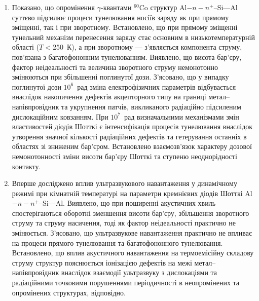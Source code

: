\begin{enumerate}[leftmargin=0cm,itemindent=3em]
\item
     Показано, що опромінення $\gamma$-квантами $^{60}$Co структур Al$-n-n^+$--Si---Al суттєво підсилює процеси тунелювання носіїв заряду як при прямому зміщенні, так і при зворотному.
     Встановлено, що при прямому зміщенні тунельний механізм перенесення заряду стає основним в низькотемпературній області ($T<250$~К),
а при зворотному --- з'являється компонента струму, пов'язана з багатофононним тунелюванням.
 Виявлено, що висота бар'єру, фактор неідеальності та величина зворотного струму немонотонно змінюються при збільшенні поглинутої дози.
З'ясовано, що у випадку поглинутої дози $10^6$~рад зміна
електрофізичних
параметрів відбувається внаслідок накопичення дефектів акцепторного типу на границі метал--напівпровідник та укрупнення патчів, викликаного радіаційно підсиленим дислокаційним ковзанням.
При $10^7$~рад
визначальними механізмами змін властивостей діодів Шотткі є інтенсифікація процесів тунелювання внаслідок утворення значної кількості радіаційних дефектів та гетерування останніх в областях зі зниженим бар'єром.
Встановлено взаємозв'язок характеру дозової немонотонності зміни висоти бар'єру Шотткі та ступеню неоднорідності контакту.


\item
Вперше досліджено вплив ультразвукового навантаження у динамічному режимі при кімнатній температурі на параметри кремнієвих діодів Шотткі Al$-n-n^+$--Si---Al.
Виявлено, що при поширенні акустичних хвиль спостерігаються оборотні зменшення висоти бар'єру,
збільшення зворотного струму та струму насичення, тоді як фактор неідеальності практично не змінюється.
З'ясовано, що ультразвукове навантаження практично не впливає на процеси прямого тунелювання та багатофононного тунелювання.
Встановлено, що вплив акустичного навантаження на термоемісійну складову струму структур пояснюється іонізацією дефектів на межі метал--напівпровідник
  внаслідок взаємодії ультразвуку з дислокаціями та радіаційними точковими порушеннями періодичності в неопромінених та опромінених структурах, відповідно.


\end{enumerate}
